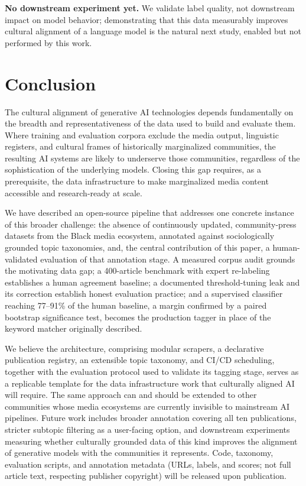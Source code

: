 \documentclass[letterpaper]{article}
\begin{document}
\textbf{No downstream experiment yet.} We validate label quality, not
downstream impact on model behavior; demonstrating that this data
measurably improves cultural alignment of a language model is the
natural next study, enabled but not performed by this work.

\section{Conclusion}

The cultural alignment of generative AI technologies depends
fundamentally on the breadth and representativeness of the data used to
build and evaluate them. Where training and evaluation corpora exclude
the media output, linguistic registers, and cultural frames of
historically marginalized communities, the resulting AI systems are
likely to underserve those communities, regardless of the sophistication
of the underlying models. Closing this gap requires, as a prerequisite,
the data infrastructure to make marginalized media content accessible
and research-ready at scale.

We have described an open-source pipeline that addresses one concrete
instance of this broader challenge: the absence of continuously updated,
community-press datasets from the Black media ecosystem, annotated
against sociologically grounded topic taxonomies, and, the central
contribution of this paper, a human-validated evaluation of that
annotation stage. A measured corpus audit grounds the motivating data
gap; a 400-article benchmark with expert re-labeling establishes a human
agreement baseline; a documented threshold-tuning leak and its
correction establish honest evaluation practice; and a supervised
classifier reaching 77--91\% of the human baseline, a margin confirmed
by a paired bootstrap significance test, becomes the production tagger
in place of the keyword matcher originally described.

We believe the architecture, comprising modular scrapers, a declarative
publication registry, an extensible topic taxonomy, and CI/CD
scheduling, together with the evaluation protocol used to validate its
tagging stage, serves as a replicable template for the data
infrastructure work that culturally aligned AI will require. The same
approach can and should be extended to other communities whose media
ecosystems are currently invisible to mainstream AI pipelines. Future
work includes broader annotation covering all ten publications, stricter
subtopic filtering as a user-facing option, and downstream experiments
measuring whether culturally grounded data of this kind improves the
alignment of generative models with the communities it represents. Code,
taxonomy, evaluation scripts, and annotation metadata (URLs, labels, and
scores; not full article text, respecting publisher copyright) will be
released upon publication.


\end{document}
